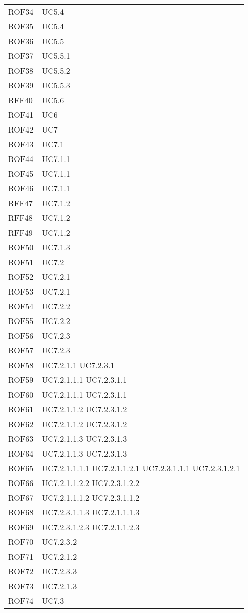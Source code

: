 \documentclass[../AnalisiDeiRequisiti_v4.0.0.tex]{subfiles}
\begin{document}
\begin{longtable}{p{4cm}!{\VRule[1pt]}p{4cm}}
ROF34 & UC5.4 \\
ROF35 & UC5.4 \\
ROF36 & UC5.5 \\
ROF37 & UC5.5.1 \\
ROF38 & UC5.5.2 \\
ROF39 & UC5.5.3 \\
RFF40 & UC5.6 \\
ROF41 & UC6 \\
ROF42 & UC7 \\
ROF43 & UC7.1 \\
ROF44 & UC7.1.1 \\
ROF45 & UC7.1.1 \\
ROF46 & UC7.1.1 \\
RFF47 & UC7.1.2 \\
RFF48 & UC7.1.2 \\
RFF49 & UC7.1.2 \\
ROF50 & UC7.1.3 \\
ROF51 & UC7.2 \\
ROF52 & UC7.2.1 \\
ROF53 & UC7.2.1 \\
ROF54 & UC7.2.2 \\
ROF55 & UC7.2.2 \\
ROF56 & UC7.2.3 \\
ROF57 & UC7.2.3 \\
ROF58 & UC7.2.1.1 UC7.2.3.1 \\
ROF59 & UC7.2.1.1.1 UC7.2.3.1.1 \\
ROF60 & UC7.2.1.1.1 UC7.2.3.1.1 \\
ROF61 & UC7.2.1.1.2 UC7.2.3.1.2 \\
ROF62 & UC7.2.1.1.2 UC7.2.3.1.2 \\
ROF63 & UC7.2.1.1.3 UC7.2.3.1.3 \\
ROF64 & UC7.2.1.1.3 UC7.2.3.1.3 \\
ROF65 & UC7.2.1.1.1.1 UC7.2.1.1.2.1 UC7.2.3.1.1.1 UC7.2.3.1.2.1 \\
ROF66 & UC7.2.1.1.2.2 UC7.2.3.1.2.2 \\
ROF67 & UC7.2.1.1.1.2 UC7.2.3.1.1.2 \\
ROF68 & UC7.2.3.1.1.3 UC7.2.1.1.1.3 \\
ROF69 & UC7.2.3.1.2.3 UC7.2.1.1.2.3 \\
ROF70 & UC7.2.3.2 \\
ROF71 & UC7.2.1.2 \\
ROF72 & UC7.2.3.3 \\
ROF73 & UC7.2.1.3 \\
ROF74 & UC7.3 \\

\end{longtable}
\end{document}
